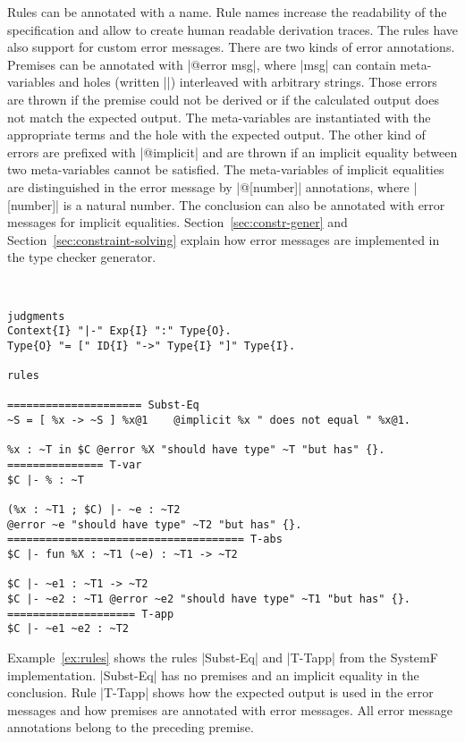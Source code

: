 Rules can be annotated with a name. Rule names increase the
readability of the specification and allow to create human readable
derivation traces. The rules have also support for custom error
messages. There are two kinds of error annotations. Premises can be
annotated with \code|@error msg|, where \code|msg| can contain
meta-variables and holes (written \code|{}|) interleaved with
arbitrary strings. Those errors are thrown if the premise could not be
derived or if the calculated output does not match the expected
output. The meta-variables are instantiated with the appropriate terms
and the hole with the expected output. The other kind of errors are
prefixed with \code|@implicit| and are thrown if an implicit equality
between two meta-variables cannot be satisfied. The meta-variables of
implicit equalities are distinguished in the error message by
\code|@[number]| annotations, where \code|[number]| is a natural
number. The conclusion can also be annotated with error messages for
implicit equalities. Section~\ref{sec:constr-gener} and
Section~\ref{sec:constraint-solving} explain how error messages are
implemented in the type checker generator.

\begin{example}{~}
\begin{lstlisting}[language=sltc]
judgments
Context{I} "|-" Exp{I} ":" Type{O}.
Type{O} "= [" ID{I} "->" Type{I} "]" Type{I}.

rules

===================== Subst-Eq
~S = [ %x -> ~S ] %x@1    @implicit %x " does not equal " %x@1.

%x : ~T in $C @error %X "should have type" ~T "but has" {}.
=============== T-var
$C |- % : ~T

(%x : ~T1 ; $C) |- ~e : ~T2
@error ~e "should have type" ~T2 "but has" {}.
===================================== T-abs
$C |- fun %X : ~T1 (~e) : ~T1 -> ~T2

$C |- ~e1 : ~T1 -> ~T2
$C |- ~e2 : ~T1 @error ~e2 "should have type" ~T1 "but has" {}.
==================== T-app
$C |- ~e1 ~e2 : ~T2
\end{lstlisting}
\label{ex:rules}
\end{example}

Example~\ref{ex:rules} shows the rules \code|Subst-Eq| and
\code|T-Tapp| from the SystemF 
implementation. \code|Subst-Eq| has no premises and an implicit
equality in the conclusion. Rule \code|T-Tapp| shows how the expected
output is used in the error messages and how premises are annotated
with error messages. All error message annotations belong to the
preceding premise.

